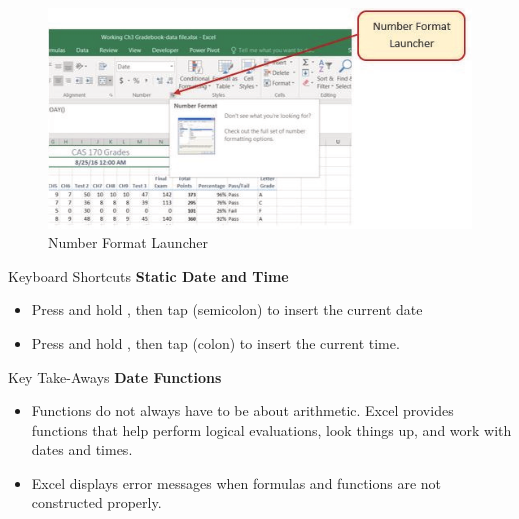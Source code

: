 \begin{figure}[H]
	\centering
	\includegraphics[width=\maxwidth{.95\linewidth}]{gfx/ch03_fig17}
	\caption{Number Format Launcher}
	\label{03:fig17}
\end{figure}

\begin{center}
	\begin{shtcutbox}{Keyboard Shortcuts}
		\textbf{Static Date and Time}
		\\
		\begin{itemize}
			\setlength{\itemsep}{0pt}
			\setlength{\parskip}{0pt}
			\setlength{\parsep}{0pt}

			\item Press and hold , then tap \fmtKeystroke{;} (semicolon) to insert the current date
			\item Press and hold , then tap \fmtKeystroke{:} (colon) to insert the current time.
			
		\end{itemize}
	\end{shtcutbox}
\end{center}


\begin{center}
	\begin{tkwbox}{Key Take-Aways}
		\textbf{Date Functions}
		\\
		\begin{itemize}
			\setlength{\itemsep}{0pt}
			\setlength{\parskip}{0pt}
			\setlength{\parsep}{0pt}

			\item Functions do not always have to be about arithmetic. Excel provides functions that help perform logical evaluations, look things up, and work with dates and times.
			\item Excel displays error messages when formulas and functions are not constructed properly.
			
		\end{itemize}
	\end{tkwbox}
\end{center}

